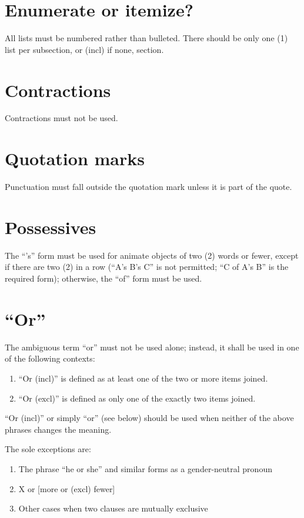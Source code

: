 \documentclass[10pt]{book}
\begin{document}
\section{Enumerate or itemize?}

All lists must be numbered rather than bulleted. There should be only one (1) list per subsection, or (incl) if none, section.

\section{Contractions}

Contractions must not be used.

\section{Quotation marks}

Punctuation must fall outside the quotation mark unless it is part of the quote.

\section{Possessives}

The ``'s'' form must be used for animate objects of two (2) words or fewer, except if there are two (2) in a row (``A's B's C'' is not permitted; ``C of A's B'' is the required form); otherwise, the ``of'' form must be used.

\section{``Or''}

The ambiguous term ``or'' must not be used alone; instead, it shall be used in one of the following contexts:

\begin{enumerate}
 \item ``Or (incl)'' is defined as at least one of the two or more items joined.
 \item ``Or (excl)'' is defined as only one of the exactly two items joined.
\end{enumerate}

``Or (incl)'' or simply ``or'' (see below) should be used when neither of the above phrases changes the meaning.

The sole exceptions are:
\begin{enumerate}
 \item The phrase ``he or she'' and similar forms as a gender-neutral pronoun
 \item X or [more or (excl) fewer]
 \item Other cases when two clauses are mutually exclusive
\end{enumerate}
\end{document}
